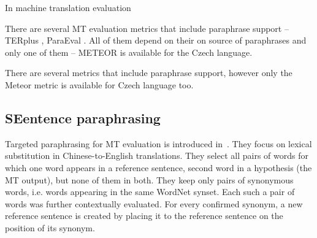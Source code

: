 \documentclass[11pt]{article}
\def \xxx#1{\textbf{\textcolor{red}{xxx: #1}}}
\begin{document}
In machine translation evaluation



There are several MT evaluation metrics that include paraphrase support --
TERplus \cite{terp}, ParaEval \cite{paraeval}. All of them depend on
their on source of paraphrases and only one of them -- METEOR 
\cite{meteor-wmt:2014} is available for the Czech language.

There are several metrics that include paraphrase support, however only the 
Meteor metric is available for Czech language too.%



\subsection{SEentence paraphrasing}

Targeted paraphrasing for MT evaluation is introduced in~. They 
focus on lexical substitution in Chinese-to-English translations.  They select 
all pairs of words for which one word appears in a reference sentence, second 
word in a hypothesis (the MT output), but none of them in both. They keep only 
pairs of synonymous words, i.e. words appearing in the same WordNet 
\cite{wordnet} synset. Each such a pair of words was further contextually 
evaluated. For every confirmed synonym, a new reference sentence is created by 
placing it to the reference sentence on the position of its synonym.

% 
\end{document}
